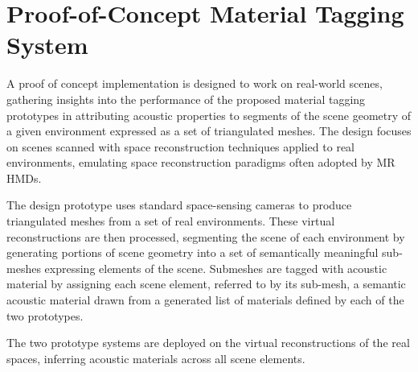 \chapter{Proof-of-Concept Material Tagging System}
A proof of concept implementation is designed to work on real-world scenes, gathering insights into the performance of the proposed material tagging prototypes in attributing acoustic properties to segments of the scene geometry of a given environment expressed as a set of triangulated meshes. The design focuses on scenes scanned with space reconstruction techniques applied to real environments, emulating space reconstruction paradigms often adopted by MR HMDs.\par
The design prototype uses standard space-sensing cameras to produce triangulated meshes from a set of real environments. These virtual reconstructions are then processed, segmenting the scene of each environment by generating portions of scene geometry into a set of semantically meaningful sub-meshes expressing elements of the scene. Submeshes are tagged with acoustic material by assigning each scene element, referred to by its sub-mesh, a semantic acoustic material drawn from a generated list of materials defined by each of the two prototypes.\par
The two prototype systems are deployed on the virtual reconstructions of the real spaces, inferring acoustic materials across all scene elements. 

